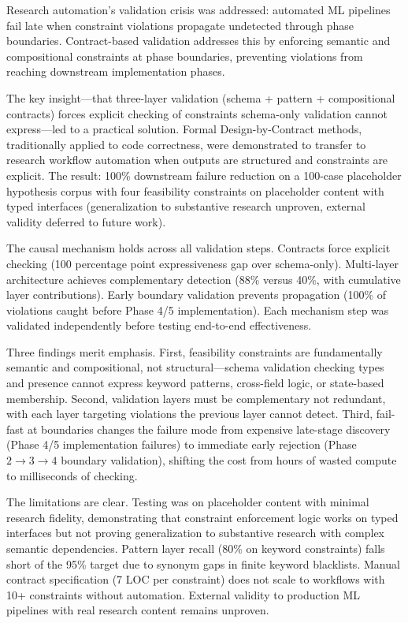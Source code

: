 
Research automation's validation crisis was addressed: automated ML pipelines fail late when constraint violations propagate undetected through phase boundaries. Contract-based validation addresses this by enforcing semantic and compositional constraints at phase boundaries, preventing violations from reaching downstream implementation phases.

The key insight---that three-layer validation (schema + pattern + compositional contracts) forces explicit checking of constraints schema-only validation cannot express---led to a practical solution. Formal Design-by-Contract methods, traditionally applied to code correctness, were demonstrated to transfer to research workflow automation when outputs are structured and constraints are explicit. The result: 100\% downstream failure reduction on a 100-case placeholder hypothesis corpus with four feasibility constraints on placeholder content with typed interfaces (generalization to substantive research unproven, external validity deferred to future work).

The causal mechanism holds across all validation steps. Contracts force explicit checking (100 percentage point expressiveness gap over schema-only). Multi-layer architecture achieves complementary detection (88\% versus 40\%, with cumulative layer contributions). Early boundary validation prevents propagation (100\% of violations caught before Phase 4/5 implementation). Each mechanism step was validated independently before testing end-to-end effectiveness.

Three findings merit emphasis. First, feasibility constraints are fundamentally semantic and compositional, not structural---schema validation checking types and presence cannot express keyword patterns, cross-field logic, or state-based membership. Second, validation layers must be complementary not redundant, with each layer targeting violations the previous layer cannot detect. Third, fail-fast at boundaries changes the failure mode from expensive late-stage discovery (Phase 4/5 implementation failures) to immediate early rejection (Phase $2\rightarrow 3\rightarrow 4$ boundary validation), shifting the cost from hours of wasted compute to milliseconds of checking.

The limitations are clear. Testing was on placeholder content with minimal research fidelity, demonstrating that constraint enforcement logic works on typed interfaces but not proving generalization to substantive research with complex semantic dependencies. Pattern layer recall (80\% on keyword constraints) falls short of the 95\% target due to synonym gaps in finite keyword blacklists. Manual contract specification (7 LOC per constraint) does not scale to workflows with 10+ constraints without automation. External validity to production ML pipelines with real research content remains unproven.


